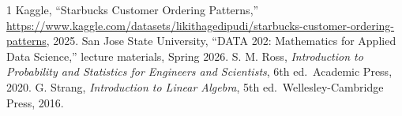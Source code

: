 \documentclass[conference,10pt]{IEEEtran}
\begin{document}
\begin{thebibliography}{1}
Kaggle, ``Starbucks Customer Ordering Patterns,'' \url{https://www.kaggle.com/datasets/likithagedipudi/starbucks-customer-ordering-patterns}, 2025.
San Jose State University, ``DATA 202: Mathematics for Applied Data Science,'' lecture materials, Spring 2026.
S. M. Ross, \emph{Introduction to Probability and Statistics for Engineers and Scientists}, 6th ed.\ Academic Press, 2020.
G. Strang, \emph{Introduction to Linear Algebra}, 5th ed.\ Wellesley\nobreakdash-Cambridge Press, 2016.
\end{thebibliography}
\end{document}
